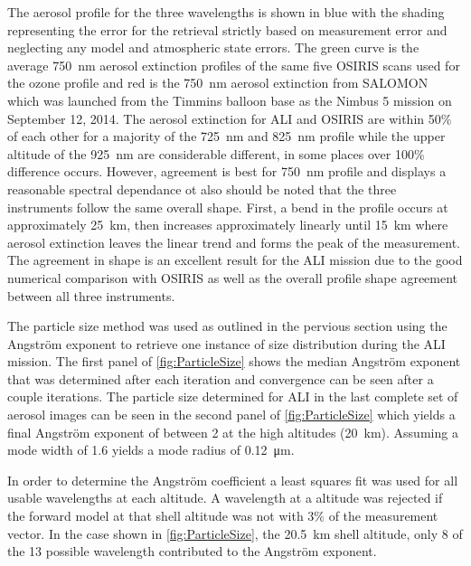 \documentclass[12pt]{article}
\begin{document}
The aerosol profile for the three wavelengths is shown in blue with the shading representing the error for the retrieval strictly based on measurement error and neglecting any model and atmospheric state errors. The green curve is the average 750~nm aerosol extinction profiles of the same five OSIRIS scans used for the ozone profile and red is the 750~nm aerosol extinction from SALOMON \citep{Berthet2002} which was launched from the Timmins balloon base as the Nimbus 5 mission on September 12, 2014. The aerosol extinction for ALI and OSIRIS are within 50\% of each other for a majority of the 725~nm and 825~nm profile while the upper altitude of the 925~nm are considerable different, in some places over 100\% difference occurs. However, agreement is best for 750~nm profile and displays a reasonable spectral dependance ot also should be noted that the three instruments follow the same overall shape.  First, a bend in the profile occurs at approximately 25~km, then increases approximately linearly until 15~km where aerosol extinction leaves the linear trend and forms the peak of the measurement. The agreement in shape is an excellent result for the ALI mission due to the good numerical comparison with OSIRIS as well as the overall profile shape agreement between all three instruments.


The particle size method was used as outlined in the pervious section using the Angstr\"{o}m exponent to retrieve one instance of size distribution during the ALI mission. The first panel of \autoref{fig:ParticleSize} shows the median Angstr\"{o}m exponent that was determined after each iteration and convergence can be seen after a couple iterations. The particle size determined for ALI in the last complete set of aerosol images can be seen in the second panel of \autoref{fig:ParticleSize} which yields a final Angstr\"{o}m exponent of between 2 at the high altitudes (20~km). Assuming a mode width of 1.6 yields a mode radius of 0.12~\si{\micro\metre}.

In order to determine the Angstr\"{o}m coefficient a least squares fit was used for all usable wavelengths at each altitude. A wavelength at a altitude was rejected if the forward model at that shell altitude was not with 3\% of the measurement vector. In the case shown in \autoref{fig:ParticleSize}, the 20.5~km shell altitude, only 8 of the 13 possible wavelength contributed to the Angstr\"{o}m exponent.
\end{document}
